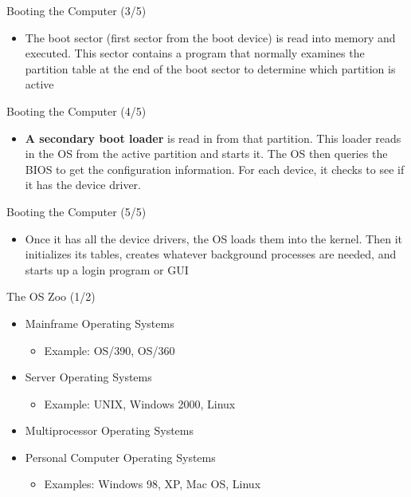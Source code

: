 \documentclass{beamer}
\begin{document}
\begin{frame}
{\centerline{Booting the Computer (3/5)}}
\begin{itemize}
    \item The boot sector (first sector from the boot device) is read into memory and executed. This sector contains a program that normally examines the partition table at the end of the boot sector to determine which partition is active
\end{itemize}
\end{frame}

\begin{frame}
{\centerline{Booting the Computer (4/5)}}
\begin{itemize}
    \item\textbf{ A secondary boot loader }is read in from that partition. This loader reads in the OS from the active partition and starts it. The OS then queries the BIOS to get the configuration information. For each device, it checks to see if it has the device driver.
\end{itemize}
\end{frame}

\begin{frame}
{\centerline{Booting the Computer (5/5)}}
\begin{itemize}
    \item Once it has all the device drivers, the OS loads them into the kernel. Then it initializes its tables, creates whatever background processes are needed, and starts up a login program or GUI
\end{itemize}
\end{frame}

\begin{frame}
{\centerline{The OS Zoo (1/2)}}
\begin{itemize}
    \item Mainframe Operating Systems
    \begin{itemize}
        \item Example: OS/390, OS/360
    \end{itemize}
    \item Server Operating Systems
    \begin{itemize}
        \item Example: UNIX, Windows 2000, Linux
    \end{itemize}
    \item Multiprocessor Operating Systems
    \item Personal Computer Operating Systems
    \begin{itemize}
        \item Examples: Windows 98, XP, Mac OS, Linux
    \end{itemize}
\end{itemize}
\end{frame}
\end{document}
